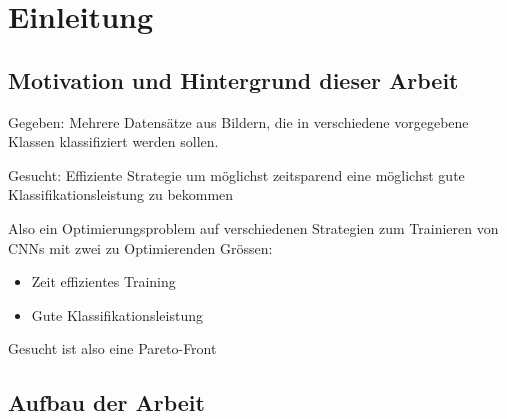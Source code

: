 \chapter{Einleitung}
\label{sec:EinleitungGesamt}

\section{Motivation und Hintergrund dieser Arbeit}
Gegeben: Mehrere Datensätze aus Bildern, die in verschiedene vorgegebene Klassen klassifiziert werden sollen.

Gesucht: Effiziente Strategie um möglichst zeitsparend eine möglichst gute Klassifikationsleistung zu bekommen

Also ein Optimierungsproblem auf verschiedenen Strategien zum Trainieren von CNNs mit zwei zu Optimierenden Grössen:
\begin{itemize}
 \item Zeit effizientes Training
 \item Gute Klassifikationsleistung
\end{itemize}

Gesucht ist also eine Pareto-Front 

\section{Aufbau der Arbeit}
